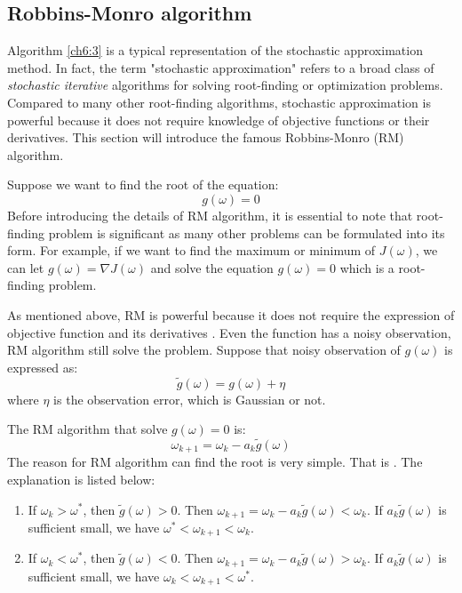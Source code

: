 \subsection{Robbins-Monro algorithm}

  Algorithm \ref{ch6:3} is a typical representation of the stochastic approximation method. In fact, the term "stochastic
  approximation" refers to a broad class of \emph{stochastic iterative} algorithms for solving root-finding or
  optimization problems. Compared to many other root-finding algorithms, stochastic approximation is powerful because it
  does not require knowledge of objective functions or their derivatives. This section will introduce the famous
  Robbins-Monro (RM) algorithm. \par

  Suppose we want to find the root of the equation:
  \begin{equation*}
    g(\omega) = 0
  \end{equation*}
  Before introducing the details of RM algorithm, it is essential to note that root-finding problem is significant as many
  other problems can be formulated into its form. For example, if we want to find the maximum or minimum of $J(\omega)$,
  we can let $g(\omega) = \nabla J(\omega)$ and solve the equation $g(\omega)=0$ which is a root-finding problem. \par As
  mentioned above, RM is powerful because it does not require the expression of objective function and its derivatives
  . Even the function
  has a noisy observation, RM algorithm still solve the problem. Suppose that noisy observation of $g(\omega)$ is
  expressed as:
  \begin{equation*}
    \tilde{g}(\omega) = g(\omega) + \eta
  \end{equation*}
  where $\eta$ is the observation error, which is Gaussian or not. \par The RM algorithm that solve $g(\omega)=0$ is:
  \begin{equation}
    \label{rm_algorithm}
    \omega_{k+1}=\omega_{k}-a_{k}\tilde{g}(\omega)
  \end{equation}
  The reason for RM algorithm can find the root is very simple. That is {}. The explanation is listed below:
  \begin{enumerate}

    \item
          If $\omega_{k}>\omega^{*}$, then $\tilde{g}(\omega)>0$. Then
          $\omega_{k+1}=\omega_{k}-a_{k}\tilde{g}(\omega)<\omega_{k}$. If $a_{k}\tilde{g}(\omega)$ is sufficient small, we have
          $\omega^{*}<\omega_{k+1}<\omega_{k}$.
    \item
          If $\omega_{k}<\omega^{*}$, then $\tilde{g}(\omega)<0$. Then
          $\omega_{k+1}=\omega_{k}-a_{k}\tilde{g}(\omega)>\omega_{k}$. If $a_{k}\tilde{g}(\omega)$ is sufficient small, we have
          $\omega_{k}<\omega_{k+1}<\omega^{*}$.

  \end{enumerate}


